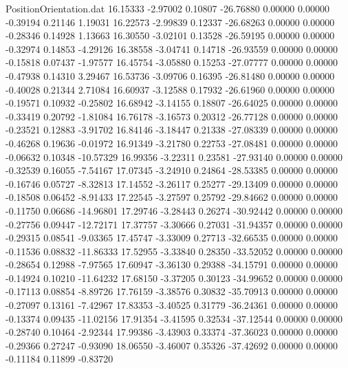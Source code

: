 \begin{filecontents}{PositionOrientation.dat}
  16.15333   -2.97002    0.10807   -26.76880    0.00000    0.00000   -0.39194    0.21146    1.19031
  16.22573   -2.99839    0.12337   -26.68263    0.00000    0.00000   -0.28346    0.14928    1.13663
  16.30550   -3.02101    0.13528   -26.59195    0.00000    0.00000   -0.32974    0.14853   -4.29126
  16.38558   -3.04741    0.14718   -26.93559    0.00000    0.00000   -0.15818    0.07437   -1.97577
  16.45754   -3.05880    0.15253   -27.07777    0.00000    0.00000   -0.47938    0.14310    3.29467
  16.53736   -3.09706    0.16395   -26.81480    0.00000    0.00000   -0.40028    0.21344    2.71084
  16.60937   -3.12588    0.17932   -26.61960    0.00000    0.00000   -0.19571    0.10932   -0.25802
  16.68942   -3.14155    0.18807   -26.64025    0.00000    0.00000   -0.33419    0.20792   -1.81084
  16.76178   -3.16573    0.20312   -26.77128    0.00000    0.00000   -0.23521    0.12883   -3.91702
  16.84146   -3.18447    0.21338   -27.08339    0.00000    0.00000   -0.46268    0.19636   -0.01972
  16.91349   -3.21780    0.22753   -27.08481    0.00000    0.00000   -0.06632    0.10348  -10.57329
  16.99356   -3.22311    0.23581   -27.93140    0.00000    0.00000   -0.32539    0.16055   -7.54167
  17.07345   -3.24910    0.24864   -28.53385    0.00000    0.00000   -0.16746    0.05727   -8.32813
  17.14552   -3.26117    0.25277   -29.13409    0.00000    0.00000   -0.18508    0.06452   -8.91433
  17.22545   -3.27597    0.25792   -29.84662    0.00000    0.00000   -0.11750    0.06686  -14.96801
  17.29746   -3.28443    0.26274   -30.92442    0.00000    0.00000   -0.27756    0.09447  -12.72171
  17.37757   -3.30666    0.27031   -31.94357    0.00000    0.00000   -0.29315    0.08541   -9.03365
  17.45747   -3.33009    0.27713   -32.66535    0.00000    0.00000   -0.11536    0.08832  -11.86333
  17.52955   -3.33840    0.28350   -33.52052    0.00000    0.00000   -0.28654    0.12988   -7.97565
  17.60947   -3.36130    0.29388   -34.15791    0.00000    0.00000   -0.14924    0.10210  -11.64232
  17.68150   -3.37205    0.30123   -34.99652    0.00000    0.00000   -0.17113    0.08854   -8.89726
  17.76159   -3.38576    0.30832   -35.70913    0.00000    0.00000   -0.27097    0.13161   -7.42967
  17.83353   -3.40525    0.31779   -36.24361    0.00000    0.00000   -0.13374    0.09435  -11.02156
  17.91354   -3.41595    0.32534   -37.12544    0.00000    0.00000   -0.28740    0.10464   -2.92344
  17.99386   -3.43903    0.33374   -37.36023    0.00000    0.00000   -0.29366    0.27247   -0.93090
  18.06550   -3.46007    0.35326   -37.42692    0.00000    0.00000   -0.11184    0.11899   -0.83720

\end{filecontents}
